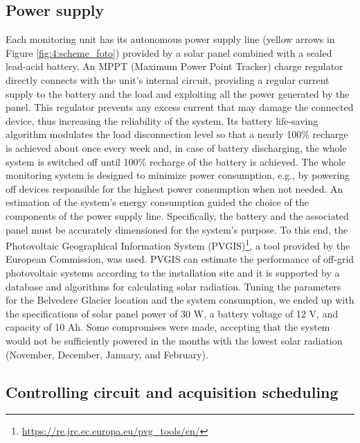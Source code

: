 \subsection{Power supply}\label{Power_supply}
Each monitoring unit has its autonomous power supply line (yellow arrows in Figure
\ref{fig:4:scheme_foto}) provided by a solar panel combined with a sealed lead-acid
battery. An MPPT (Maximum Power Point Tracker) charge regulator directly connects with
the unit's internal circuit, providing a regular current supply to the battery
and the load and exploiting all the power generated by the panel. This regulator prevents
any excess current that may damage the connected device, thus increasing the reliability
of the system. Its battery life-saving algorithm modulates the load disconnection level
so that a nearly 100\% recharge is achieved about once every week and, in case of battery
discharging, the whole system is switched off until 100\% recharge of the battery is
achieved.
The whole monitoring system is designed to minimize power consumption, e.g., by powering
off devices responsible for the highest power consumption when not needed.
An estimation of the system's energy consumption guided the choice of the components of
the power supply line. 
Specifically, the battery and the associated panel must be
accurately dimensioned for the system's purpose. 
To this end, the Photovoltaic Geographical Information System (PVGIS)\footnote{\url{https://re.jrc.ec.europa.eu/pvg_tools/en/}}, a tool provided by the European Commission, was used.
PVGIS can estimate the performance of off-grid photovoltaic systems according to the installation site and it is supported by a database and algorithms for calculating solar radiation. 
Tuning the parameters for the Belvedere Glacier location and the system consumption, we ended up with the specifications of solar panel power of 30 W, a battery voltage of 12 V, and capacity of 10 Ah. 
Some compromises were made, accepting that the system would not be sufficiently powered in the months with the lowest solar radiation (November, December, January, and February). 

\subsection{Controlling circuit and acquisition scheduling}\label{Control}

